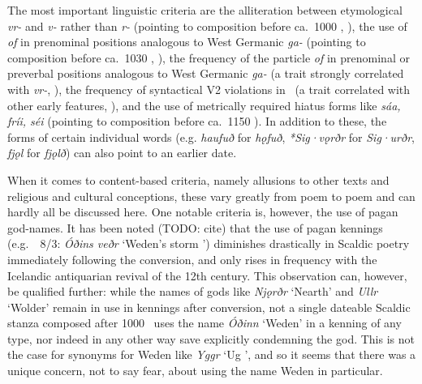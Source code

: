 The most important linguistic criteria are the alliteration between etymological \emph{vr-} and \emph{v-} rather than \emph{r-} (pointing to composition before ca.~1000 \ce, \cite{Haukur2017}), the use of \emph{of} in prenominal positions analogous to West Germanic \emph{ga-} (pointing to composition before ca.~1030 \ce, \cite{Males2025Of}),
the frequency of the particle \emph{of} in prenominal or preverbal positions analogous to West Germanic \emph{ga-} (a trait strongly correlated with \emph{vr-}, \cite[54]{Haukur2016}),
the frequency of syntactical V2 violations in \Fornyrdislag\ (a trait correlated with other early features, \cite{Haukur2012}),
and the use of metrically required hiatus forms like \emph{sáa, fríi, séi} (pointing to composition before ca.~1150 \ce).  In addition to these, the forms of certain individual words (e.g. \emph{haufuð} for \emph{hǫfuð}, \emph{*Sig·vǫrðr} for \emph{Sig·urðr}, \emph{fjǫl} for \emph{fjǫlð}) can also point to an earlier date.

When it comes to content-based criteria, namely allusions to other texts and religious and cultural conceptions, these vary greatly from poem to poem and can hardly all be discussed here.  One notable criteria is, however, the use of pagan god-names.  It has been noted (TODO: cite) that the use of pagan kennings (e.g.~\Hakonarmal\ 8/3: \emph{Óðins veðr} ‘Weden’s storm ’) diminishes drastically in Scaldic poetry immediately following the conversion, and only rises in frequency with the Icelandic antiquarian revival of the 12th century.  This observation can, however, be qualified further: while the names of gods like \emph{Njǫrðr} ‘Nearth’ and \emph{Ullr} ‘Wolder’ remain in use in kennings after conversion, not a single dateable Scaldic stanza composed after 1000 \ce\ uses the name \emph{Óðinn} ‘Weden’ in a kenning of any type, nor indeed in any other way save explicitly condemning the god.  This is not the case for synonyms for Weden like \emph{Yggr} ‘Ug ’, and so it seems that there was a unique concern, not to say fear, about using the name Weden in particular.

